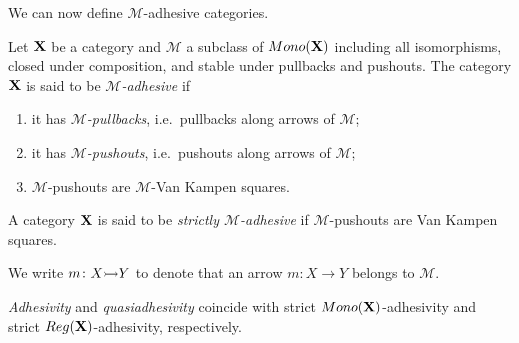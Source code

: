 \documentclass[a4paper,UKenglish,cleveref,pdftex,thm-restate,numberwithinsect]{lipics-v2021}
\newcommand{\mor}{\mathsf{Mor}}
\newcommand{\mon}{\mathsf{Mono}}
\newcommand{\reg}{\mathsf{Reg}}
\def\A{\textbf {\textup{A}}}
\newcommand{\mto}[0]{\scalebox{1}{$\rightarrowtail$}}
\def\C{\textbf {\textup{C}}}
\def\X{\textbf {\textup{X}}}
\begin{document}


We can now define $\mathcal{M}$-adhesive categories.

\begin{definition}
  Let $\X$ be a category and $\mathcal{M}$ a subclass of
  $\mon(\X)$
  including  all isomorphisms, closed under composition,
  and stable under pullbacks and pushouts.
  The category
  $\X$ is said to be \emph{$\mathcal{M}$-adhesive} if
  \begin{enumerate}
  \item it has \emph{$\mathcal{M}$-pullbacks}, i.e.~pullbacks along arrows of $\mathcal{M}$;
  \item it has \emph{$\mathcal{M}$-pushouts}, i.e.~pushouts along arrows of $\mathcal{M}$;
  \item  $\mathcal{M}$-pushouts are $\mathcal{M}$-Van Kampen squares.
  \end{enumerate}
  
  A category $\X$ is said to be \emph{strictly $\mathcal{M}$-adhesive}
  if $\mathcal{M}$-pushouts are Van Kampen squares.
\end{definition}

We write $m\colon X\mto Y$ to denote that an arrow $m\colon X\to Y$ belongs to $\mathcal{M}$.

\begin{remark}
  \label{rem:salva}
  \emph{Adhesivity} and \emph{quasiadhesivity} 
  \cite{lack2005adhesive,garner2012axioms} coincide with strict
  $\mon(\X) $-adhesivity and strict $\reg(\X)$-adhesivity,
  respectively.
\end{remark}
\end{document}
